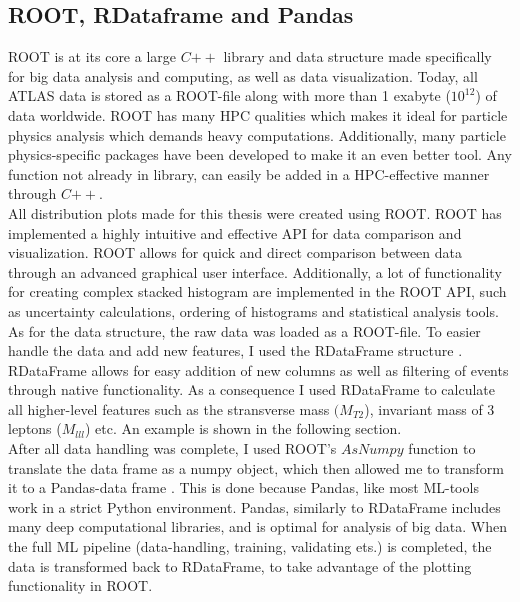 \subsection{ROOT, RDataframe and Pandas}
ROOT \cite{ROOT} is at its core a large $C{++}$ library and data structure made specifically for big data
analysis and computing, as well as data visualization. Today, all ATLAS data is stored as a ROOT-file along
with more than 1 exabyte ($10^{12}$) of data worldwide. ROOT has many \ac{HPC} qualities which makes it ideal for particle
physics analysis which demands heavy computations. Additionally, many particle physics-specific packages
have been developed to make it an even better tool. Any function not already in library,
can easily be added in a \ac{HPC}-effective manner through $C{++}$.
\\
All distribution plots made for this thesis were created using ROOT. ROOT has implemented a highly intuitive and
effective \ac{API} for data comparison and visualization. ROOT allows for quick and direct 
comparison between data through an advanced graphical user interface. Additionally, a lot of
functionality for creating complex stacked histogram are implemented in the ROOT \ac{API}, such
as uncertainty calculations, ordering of histograms and statistical analysis tools. 
\\
As for the data structure, the raw data was loaded as a ROOT-file. To easier handle the data and add
new features, I used the RDataFrame structure \cite{RDataFrame}. RDataFrame allows for easy 
addition of new columns as well as filtering of events through native functionality. As a consequence
I used RDataFrame to calculate all higher-level features such as the stransverse mass $(M_{T2}$), 
invariant mass of 3 leptons ($M_{lll}$) etc. An example is shown in the following section. 
\\
After all data handling was complete, I used ROOT's $AsNumpy$ function to translate the data frame as 
a numpy object, which then allowed me to transform it to a Pandas-data frame \cite{Pandas}. This is done
because Pandas, like most \ac{ML}-tools work in a strict Python environment. Pandas, similarly to RDataFrame
includes many deep computational libraries, and is optimal for analysis of big data. When the full \ac{ML} 
pipeline (data-handling, training, validating ets.) is completed, the data is transformed back to RDataFrame, 
to take advantage of the plotting functionality in ROOT.

